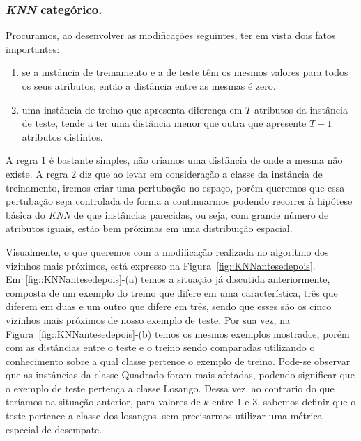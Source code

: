 \subsubsection{\textit{KNN} categórico.}
\label{subsubsec::knncat}

Procuramos, ao desenvolver as modificações seguintes, ter em vista dois fatos importantes:
\begin{enumerate}
\item se a instância de treinamento e a de teste têm os mesmos valores para todos os seus atributos, então a distância entre as mesmas é zero. 
\item uma instância de treino que apresenta diferença em $T$ atributos da instância de teste, tende a ter uma distância menor que outra que apresente $T+1$ atributos distintos.
\end{enumerate}

A regra 1 é bastante simples, não criamos uma distância de onde a mesma não existe. A regra 2 diz que ao levar em consideração a classe da instância de treinamento, iremos criar uma pertubação no espaço, porém queremos que essa pertubação seja controlada de forma a continuarmos podendo recorrer à hipótese básica do \textit{KNN} de que instâncias parecidas, ou seja, com grande número de atributos iguais, estão bem próximas em uma distribuição espacial.

Visualmente, o que queremos com a modificação realizada no algoritmo dos vizinhos mais próximos, está expresso na Figura~\ref{fig::KNNantesedepois}. Em~\ref{fig::KNNantesedepois}-(a) temos a situação já discutida anteriormente, composta de um exemplo do treino que difere em uma característica, três que diferem em duas e um outro que difere em três, sendo que esses são os cinco vizinhos mais próximos de nosso exemplo de teste. Por sua vez, na Figura~\ref{fig::KNNantesedepois}-(b) temos os mesmos exemplos mostrados, porém com as distâncias entre o teste e o treino sendo comparadas utilizando o conhecimento sobre a qual classe pertence o exemplo de treino. Pode-se observar que as instâncias da classe Quadrado foram mais afetadas, podendo significar que o exemplo de teste pertença a classe Losango. Dessa vez, ao contrario do que teríamos na situação anterior, para valores de $k$ entre 1 e 3, sabemos definir que o teste pertence a classe dos losangos, sem precisarmos utilizar uma métrica especial de desempate. 

